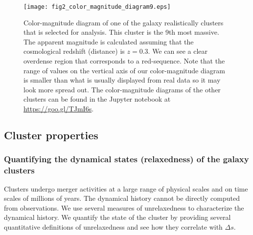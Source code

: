 \begin{figure}
	\centering
	\texttt{[image: fig2\_color\_magnitude\_diagram9.eps]}
	\caption{Color-magnitude diagram of one of the galaxy realistically clusters that is selected for 
		analysis. This cluster is the 9th most massive. 
		The apparent magnitude is calculated assuming that 
		the cosmological redshift (distance) is $z = 0.3$. 
		We can see a clear overdense region that corresponds to a red-sequence.
		Note that the range of values on the vertical axis of our color-magnitude diagram is  
		smaller than what is usually displayed from real data so it may look more
		spread out.	The color-magnitude diagrams of the other clusters can be found in the
		Jupyter notebook at \href{https://github.com/karenyyng/galaxy_DM_offset/blob/master/code/analyses/fig2_color_magnitude_diagram.ipynb}{https://goo.gl/TJmI6s}.
		\label{fig:color_magnitude_diagram}
	} 
\end{figure}


\subsection{Cluster properties}
\label{subsec:cluster_properties}

\subsubsection{Quantifying the dynamical states (relaxedness) of the galaxy clusters}
\label{subsubsec:relaxedness}

Clusters undergo merger activities at a large range of physical scales and 
on time scales of millions of years. 
The dynamical history cannot be directly 
computed from observations. We use several measures of unrelaxedness to characterize 
the dynamical history.
We quantify the state of the cluster by providing several quantitative
definitions of unrelaxedness and see how they correlate with $\Delta s$.

